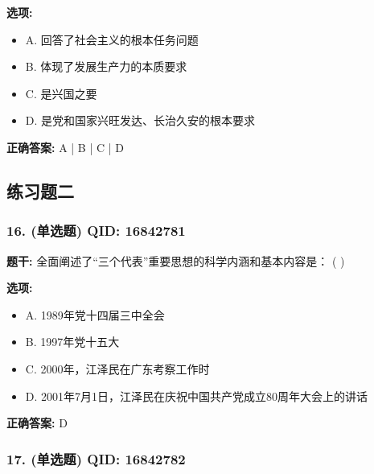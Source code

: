 \documentclass[12pt,UTF8]{ctexart}
\begin{document}
\textbf{选项:}
\begin{itemize}[leftmargin=*]

  \item A. 回答了社会主义的根本任务问题

  \item B. 体现了发展生产力的本质要求

  \item C. 是兴国之要

  \item D. 是党和国家兴旺发达、长治久安的根本要求

\end{itemize}

\textbf{正确答案:}
A | B | C | D

\vspace{0.3em}\hrulefill\vspace{0.7em}

\subsection*{练习题二}

\subsubsection*{16. (单选题) \small QID: 16842781}

\textbf{题干:}
全面阐述了“三个代表”重要思想的科学内涵和基本内容是： ( )

\textbf{选项:}
\begin{itemize}[leftmargin=*]

  \item A. 1989年党十四届三中全会

  \item B. 1997年党十五大

  \item C. 2000年，江泽民在广东考察工作时

  \item D. 2001年7月1日，江泽民在庆祝中国共产党成立80周年大会上的讲话

\end{itemize}

\textbf{正确答案:}
D

\vspace{0.3em}\hrulefill\vspace{0.7em}

\subsubsection*{17. (单选题) \small QID: 16842782}
\end{document}
